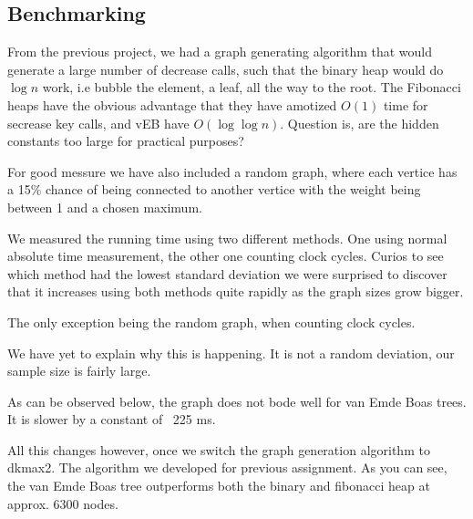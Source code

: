 \subsection*{Benchmarking}
From the previous project, we had a graph generating algorithm that would generate a large number of decrease calls, such that the binary heap would do $\log n$ work, i.e bubble the element, a leaf, all the way to the root. The Fibonacci heaps have the obvious advantage that they have amotized $O(1)$ time for secrease key calls, and vEB have $O(\log \log n)$. Question is, are the hidden constants too large for practical purposes?

For good messure we have also included a random graph, where each vertice has a 15\% chance of being connected to another vertice with the weight being between 1 and a chosen maximum.

We measured the running time using two different methods. One using normal absolute time measurement, the other one counting clock cycles. Curios to see which method had the lowest standard deviation we were surprised to discover that it increases using both methods quite rapidly as the graph sizes grow bigger.\newline


The only exception being the random graph, when counting clock cycles.\newline


We have yet to explain why this is happening. It is not a random deviation, our sample size is fairly large.\newline


As can be observed below, the graph does not bode well for van Emde Boas trees. It is slower by a constant of ~225 ms.\newline


All this changes however, once we switch the graph generation algorithm to dkmax2. The algorithm we developed for previous assignment. As you can see, the van Emde Boas tree outperforms both the binary and fibonacci heap at approx. 6300 nodes.\newline

